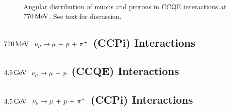 \begin{figure}
    \centering
    \caption[Angular distribution of $\mu$, $p$ at $770\MeV$]{\label{fig:ccqe-770-angle}Angular distribution of muons and protons in \acs{CCQE} interactions at $770\MeV$. See text for discussion.}
\end{figure}

\subsection{$770\MeV$ $\nu_\mu \rightarrow \mu\,+\,p\,+\,\pi^{+}$ (\acs{CCPi}) Interactions}

\subsection{$4.5\,\mathrm{GeV}$ $\nu_\mu \rightarrow \mu\,+\,p$ (CCQE) Interactions}

\subsection{$4.5\,\mathrm{GeV}$ $\nu_\mu \rightarrow \mu\,+\,p\,+\,\pi^{+}$ (\acs{CCPi}) Interactions}
